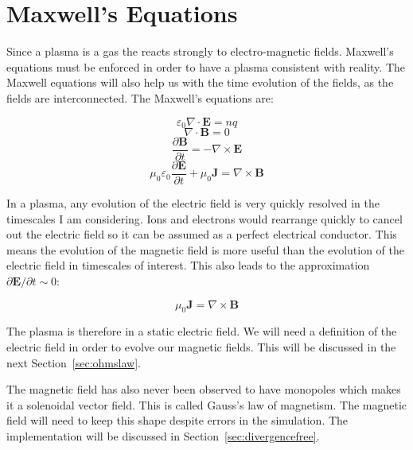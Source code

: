 \documentclass[12pt,upcase]{umlthesis}
\begin{document}
\section{Maxwell's Equations}\label{sec:maxwell}

Since a plasma is a gas the reacts strongly to electro-magnetic fields. Maxwell's equations must be enforced in order to have a plasma consistent with reality. The Maxwell equations will also help us with the time evolution of the fields, as the fields are interconnected. The Maxwell's equations are:

\begin{equation}\label{eq:gausslaw}
	\varepsilon_0\nabla\cdot\textbf{E} = n q
\end{equation}
\begin{equation}\label{eq:maggausslaw}
	\nabla\cdot\textbf{B} = 0
\end{equation}
\begin{equation}\label{eq:lawofinduction}
	\frac{\partial\textbf{B}}{\partial t} = - \nabla\times\textbf{E}
\end{equation}
\begin{equation}\label{eq:ampereslaw}
	\mu_0\varepsilon_0\frac{\partial\textbf{E}}{\partial t} + \mu_0\textbf{J} = \nabla\times\textbf{B}
\end{equation}

In a plasma, any evolution of the electric field is very quickly resolved in the timescales I am considering. Ions and electrons would rearrange quickly to cancel out the electric field so it can be assumed as a perfect electrical conductor. This means the evolution of the magnetic field is more useful than the evolution of the electric field in timescales of interest. This also leads to the approximation $\partial\textbf{E}/\partial t \sim 0$:

\begin{equation}\label{eq:ampereslawapprox}
	\mu_0\textbf{J} = \nabla\times\textbf{B}
\end{equation}

The plasma is therefore in a static electric field. We will need a definition of the electric field in order to evolve our magnetic fields. This will be discussed in the next Section~\ref{sec:ohmslaw}.

The magnetic field has also never been observed to have monopoles which makes it a solenoidal vector field. This is called Gauss's law of magnetism. The magnetic field will need to keep this shape despite errors in the simulation. The implementation will be discussed in Section~\ref{sec:divergencefree}.
\end{document}
